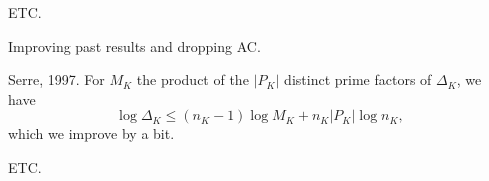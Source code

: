 \documentclass[reqno]{amsart} 
\begin{document}
ETC.

Improving past results and dropping AC.

Serre, 1997.  For $M_K$ the product of the $\lvert P_K \rvert$ distinct prime factors of $\Delta_K$, we have
\begin{equation*}
  \log \Delta_K \leq(n_K - 1) \log M_K + n_K \lvert P_K \rvert \log n_K,
\end{equation*}
which we improve by a bit.

ETC.


{} 
\end{document}
